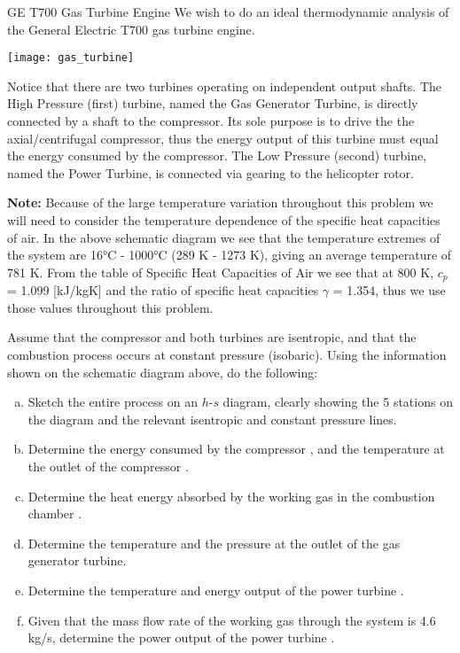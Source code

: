 \begin{example}[label=ex:T700]{GE T700 Gas Turbine Engine}
  We wish to do an ideal thermodynamic analysis of the General Electric T700 gas turbine engine.
  \begin{center}
    \texttt{[image: gas\_turbine]}
  \end{center}
  Notice that there are two turbines operating on independent output shafts. The High Pressure (first) turbine, named the Gas Generator Turbine, is directly connected by a shaft to the compressor. Its sole purpose is to drive the the axial/centrifugal compressor, thus the energy output of this turbine must equal the energy consumed by the compressor. The Low Pressure (second) turbine, named the Power Turbine, is connected via gearing to the helicopter rotor.

  {\bf Note:} Because of the large temperature variation throughout this problem we will need to consider the temperature dependence of the specific heat capacities of air. In the above schematic diagram we see that the temperature extremes of the system are 16°C - 1000°C (289 K - 1273 K), giving an average temperature of 781 K. From the table of Specific Heat Capacities of Air we see that at 800 K, $c_p$ = 1.099 [kJ/kgK] and the ratio of specific heat capacities $\gamma$ = 1.354, thus we use those values throughout this problem.
  
  Assume that the compressor and both turbines are isentropic, and that the combustion process occurs at constant pressure (isobaric). Using the information shown on the schematic diagram above, do the following:
  \begin{enumerate}[a)]
  \item  Sketch the entire process on an $h$-$s$ diagram, clearly showing the 5 stations on the diagram and the relevant isentropic and constant pressure lines.
  \item Determine the energy consumed by the compressor \answer{[$w_C$ = -328 kJ/kg]}, and the temperature at the outlet of the compressor \answer{[$T_2$ = 587 K]}.
  \item Determine the heat energy absorbed by the working gas in the combustion chamber \answer{[$q_H$ = 754 kJ/kg]}.
  \item Determine the temperature \answer{[$T_4$ = 975 K]} and the pressure \answer{[$p_4$ = 546 kPa]} at the outlet of the gas generator turbine.
  \item Determine the temperature \answer{[$T_5$ = 627 K]} and energy output of the power turbine \answer{[$w_{PT}$ = 382.5 kJ/kg]}.
  \item Given that the mass flow rate of the working gas through the system is 4.6 kg/s, determine the power output of the power turbine \answer{[1.76 MW]}.
  \end{enumerate}


\end{example}
